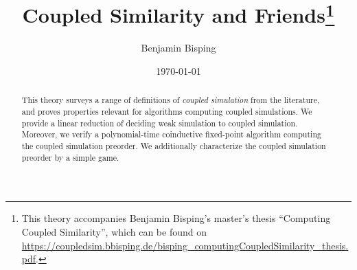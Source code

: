 \documentclass[10pt,a4paper]{article}
\title{ Coupled Similarity and Friends\footnote{This theory accompanies Benjamin Bisping's master's thesis ``Computing Coupled Similarity'', which can be found on \url{https://coupledsim.bbisping.de/bisping_computingCoupledSimilarity_thesis.pdf}.} }
\author{ Benjamin Bisping }
\date{\today}
\begin{document}
\maketitle

\begin{abstract}

This theory surveys a range of definitions of \emph{coupled simulation} from the literature, and proves properties relevant for algorithms computing coupled simulations.
We provide a linear reduction of deciding weak simulation to coupled simulation.
Moreover, we verify a polynomial-time coinductive fixed-point algorithm computing the coupled simulation preorder.
We additionally characterize the coupled simulation preorder by a simple game.

\end{abstract}

\newpage

\tableofcontents
\newpage



% 
% 
\end{document}
